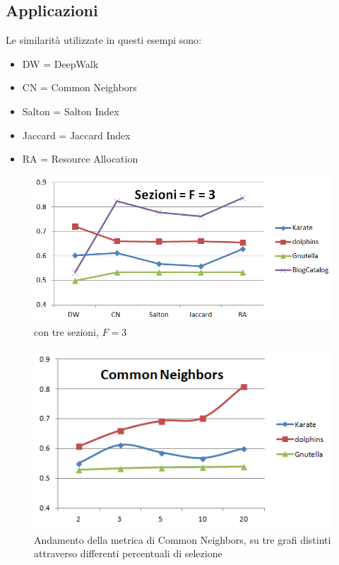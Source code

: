\subsection{Applicazioni}
Le similarità utilizzate in questi esempi sono\cite{all_metric}:
\begin{itemize}
	\item DW = DeepWalk
	\item CN = Common Neighbors\cite{CN_metric}
	\item Salton = Salton Index\cite{Salton_metric}
	\item Jaccard = Jaccard Index
	\item RA = Resource Allocation\cite{RA_metric}
\end{itemize}
%
\begin{figure}[htp]
	\centering
	\includegraphics[width=\linewidth]{immagini/LP_fold3}
	\caption{\LPred con tre sezioni, $F=3$}
	\label{fig:LP_fold3}
\end{figure}
%
\begin{figure}[htp]
	\centering
	\includegraphics[width=\linewidth]{immagini/LP_CN}
	\caption{Andamento della metrica di Common Neighbors, su tre grafi distinti attraverso differenti percentuali di selezione}
	\label{fig:LP_CN}
\end{figure}

